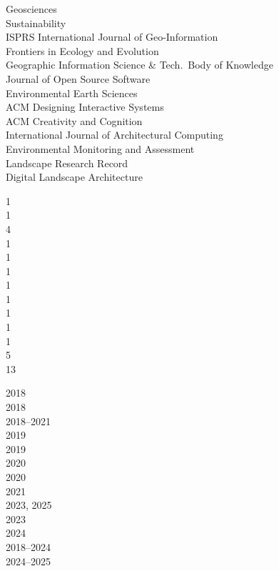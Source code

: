 \documentclass[10pt]{designcv}
\begin{document}
\begin{minipage}[t]{0.65\textwidth}
Geosciences\\
Sustainability\\
ISPRS International Journal of Geo-Information\\
Frontiers in Ecology and Evolution\\
Geographic Information Science \& Tech.~Body of Knowledge\\
Journal of Open Source Software\\
Environmental Earth Sciences\\
ACM Designing Interactive Systems\\
ACM Creativity and Cognition\\
International Journal of Architectural Computing\\
Environmental Monitoring and Assessment\\
Landscape Research Record\\
Digital Landscape Architecture\\
\end{minipage}
\hfill
\begin{minipage}[t]{0.05\textwidth}
1\\
1\\
4\\
1\\
1\\
1\\
1\\
1\\
1\\
1\\
1\\
5\\
13\\
\end{minipage}
\hfill
\begin{minipage}[t]{0.15\textwidth}
2018\\
2018\\
2018--2021\\
2019\\
2019\\
2020\\
2020\\
2021\\
2023, 2025\\
2023\\
2024\\
2018--2024\\
2024--2025\\
\end{minipage}
\end{document}
